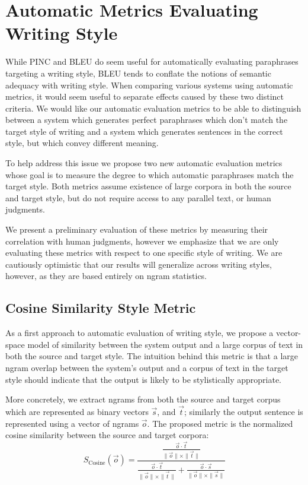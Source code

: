 \documentclass[10pt,a5paper,twoside]{article}
\begin{document}
\section{Automatic Metrics Evaluating Writing Style}
While PINC and BLEU do seem useful for automatically evaluating paraphrases targeting a  writing style, BLEU tends to conflate the notions of
semantic adequacy with writing style.  When comparing various systems using automatic metrics, it would seem useful
to separate effects caused by these two distinct criteria.  We would like our automatic evaluation metrics to be able to distinguish
between a system which generates perfect paraphrases which don't match the target style of writing and a system which
generates sentences in the correct style, but which convey different meaning.

To help address this issue we propose two new automatic evaluation metrics whose goal is to measure the degree to which
automatic paraphrases match the target style.  Both metrics assume existence of large corpora in both the source and
target style, but do not require access to any parallel text, or human judgments.

We present a preliminary evaluation of these metrics by measuring their correlation with human judgments, however
we emphasize that we are only evaluating these metrics with respect to one specific style of writing.  We
are cautiously optimistic that our results will generalize across writing styles, however, as they are based entirely
on ngram statistics.

\subsection{Cosine Similarity Style Metric}
As a first approach to automatic evaluation of writing style, we propose a vector-space model of similarity between the system
output and a large corpus of text in both the source and target style.  The intuition behind this metric is that  a large ngram
overlap between the system's output and a corpus of text in the target style should indicate that the
output is likely to be stylistically appropriate.

More concretely, we extract ngrams from both the source and target corpus which are represented as binary
vectors $\vec{s}$, and $\vec{t}$; similarly the output sentence is represented using a vector of
ngrams $\vec{o}$.  
The proposed metric is the normalized cosine similarity between the source and target corpora:
\[
S_{\text{Cosine}}(\vec{o}) = \frac{\frac{\vec{o} \cdot \vec{t}}{\|\vec{o}\| \times \|\vec{t}\|}}{\frac{\vec{o} \cdot \vec{t}}{\|\vec{o}\| \times \|\vec{t}\|} + \frac{\vec{o} \cdot \vec{s}}{\|\vec{o}\| \times \|\vec{s}\|}}
\]
 
\end{document}
